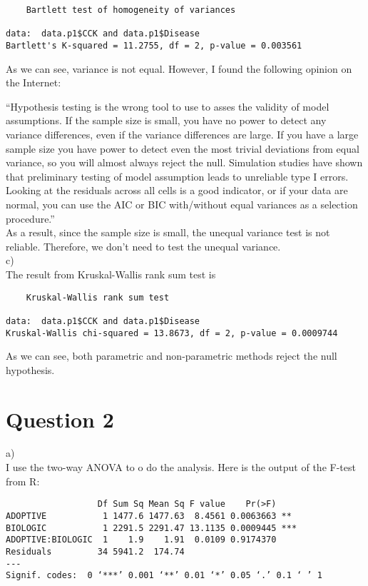 \documentclass[12pt]{article}
\begin{document}
\begin{verbatim}
	Bartlett test of homogeneity of variances

data:  data.p1$CCK and data.p1$Disease 
Bartlett's K-squared = 11.2755, df = 2, p-value = 0.003561
\end{verbatim}

As we can see, variance is not equal. However, I found the following
opinion on the Internet:

``Hypothesis testing is the wrong tool to use to asses the validity of
model assumptions. If the sample size is small, you have no power to
detect any variance differences, even if the variance differences are
large. If you have a large sample size you have power to detect even
the most trivial deviations from equal variance, so you will almost
always reject the null. Simulation studies have shown that preliminary
testing of model assumption leads to unreliable type I errors. \\

Looking at the residuals across all cells is a good indicator, or if
your data are normal, you can use the AIC or BIC with/without equal
variances as a selection procedure.'' \\

As a result, since the sample size is small, the unequal variance test
is not reliable. Therefore, we don't need to test the unequal
variance. \\

c) \\

The result from Kruskal-Wallis rank sum test is 

\begin{verbatim}
	Kruskal-Wallis rank sum test

data:  data.p1$CCK and data.p1$Disease 
Kruskal-Wallis chi-squared = 13.8673, df = 2, p-value = 0.0009744
\end{verbatim}

As we can see, both parametric and non-parametric methods reject the
null hypothesis.

\section*{Question 2}

a) \\

I use the two-way ANOVA to o do the analysis. Here is the output of
the F-test from R:

\begin{verbatim}
                  Df Sum Sq Mean Sq F value    Pr(>F)    
ADOPTIVE           1 1477.6 1477.63  8.4561 0.0063663 ** 
BIOLOGIC           1 2291.5 2291.47 13.1135 0.0009445 ***
ADOPTIVE:BIOLOGIC  1    1.9    1.91  0.0109 0.9174370    
Residuals         34 5941.2  174.74                      
---
Signif. codes:  0 ‘***’ 0.001 ‘**’ 0.01 ‘*’ 0.05 ‘.’ 0.1 ‘ ’ 1 
\end{verbatim}
\end{document}
